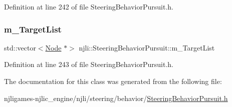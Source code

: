 Definition at line 242 of file Steering\+Behavior\+Pursuit.\+h.

\mbox{\label{classnjli_1_1_steering_behavior_pursuit_a283043aaa5ea2a7998baf38565fca847}} 
\subsubsection{\texorpdfstring{m\+\_\+\+Target\+List}{m\_TargetList}}
{\footnotesize\ttfamily std\+::vector$<$\mbox{\hyperlink{classnjli_1_1_node}{Node}} $\ast$$>$ njli\+::\+Steering\+Behavior\+Pursuit\+::m\+\_\+\+Target\+List\hspace{0.3cm}{\ttfamily [private]}}



Definition at line 243 of file Steering\+Behavior\+Pursuit.\+h.



The documentation for this class was generated from the following file\+:\begin{DoxyCompactItemize}
\item 
njligames-\/njlic\+\_\+engine/njli/steering/behavior/\mbox{\hyperlink{_steering_behavior_pursuit_8h}{Steering\+Behavior\+Pursuit.\+h}}\end{DoxyCompactItemize}
